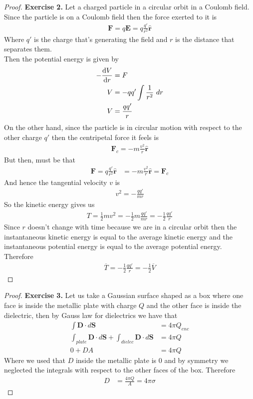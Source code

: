 \documentclass[11pt]{article}
\newcommand{\hatr}{\bm{\hat{r}}}
\theoremstyle{definition}
\begin{document}
\cleardoublepage
\begin{proof}{\textbf{Exercise 2.}}
Let a charged particle in a circular orbit in a Coulomb field.
\\
Since the particle is on a Coulomb field then the force exerted to it is
\begin{align*}
    \bm{F} = q\bm{E} = q\frac{q'}{r^2}\hatr
\end{align*}
Where $q'$ is the charge that's generating the field and $r$ is the distance
that separates them.
\\
Then the potential energy is given by
\begin{align*}
    - \dv{V}{r} &= F\\
    V &= -qq'\int \frac{1}{r^2}~dr\\
    V &= \frac{qq'}{r}
\end{align*}
On the other hand, since the particle is in circular motion with respect to
the other charge $q'$ then the centripetal force it feels is
\begin{align*}
    \bm{F}_c = -m \frac{v^2}{r}\hatr
\end{align*}
But then, must be that
\begin{align*}
    \bm{F} = q\frac{q'}{r^2}\hatr &= -m \frac{v^2}{r}\hatr = \bm{F}_c
\end{align*}
And hence the tangential velocity $v$ is
\begin{align*}
    v^2 = -\frac{qq'}{mr}
\end{align*}
So the kinetic energy gives us
\begin{align*}
    T = \frac{1}{2}mv^2 = -\frac{1}{2}m\frac{qq'}{mr}
    = -\frac{1}{2}\frac{qq'}{r}
\end{align*}
Since $r$ doesn't change with time because we are in a circular orbit then
the instantaneous kinetic energy is equal to the average kinetic energy and
the instantaneous potential energy is equal to the average potential energy.
\\
Therefore
\begin{align*}
    \overline{T} = -\frac{1}{2}\frac{qq'}{r} = -\frac{1}{2}\overline{V}
\end{align*}
\end{proof}

\cleardoublepage
\begin{proof}{\textbf{Exercise 3.}}
Let us take a Gaussian surface shaped as a box where one face is inside the
metallic plate with charge $Q$ and the other face is inside the dielectric,
then by Gauss law for dielectrics we have that
\begin{align*}
    \int \bm{D}\cdot d\bm{S} &= 4\pi Q_{enc}\\
    \int_{plate} \bm{D}\cdot d\bm{S} + \int_{dielec} \bm{D}\cdot d\bm{S} &= 4\pi Q\\
    0 + D A &= 4\pi Q
\end{align*}
Where we used that $D$ inside the metallic plate is 0 and by symmetry we
neglected the integrals with respect to the other faces of the box.
Therefore
\begin{align*}
    D &= \frac{4\pi Q}{A} = 4\pi \sigma
\end{align*}

\end{proof}
\end{document}

